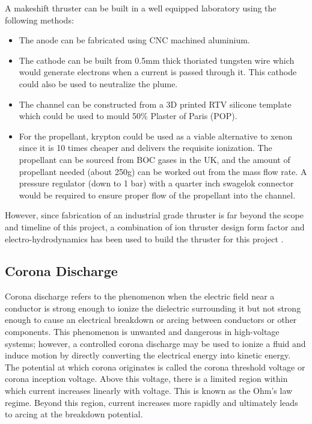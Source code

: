\documentclass[11pt]{article}
\begin{document}
A makeshift thruster can be built in a well equipped laboratory using the following methods:

\begin{itemize}
\item The anode can be fabricated using CNC machined aluminium.
\item The cathode can be built from 0.5mm thick thoriated tungsten wire which would generate electrons when a current is passed through it. This cathode could also be used to neutralize the plume.
\item The channel can be constructed from a 3D printed RTV silicone template which could be used to mould 50\% Plaster of Paris (POP).
\item For the propellant, krypton could be used as a viable alternative to xenon since it is 10 times cheaper and delivers the requisite ionization. The propellant can be sourced from BOC gases in the UK, and the amount of propellant needed (about 250g) can be worked out from the mass flow rate. A pressure regulator (down to 1 bar) with a quarter inch swagelok connector would be required to ensure proper flow of the propellant into the channel.
\end{itemize}


However, since fabrication of an industrial grade thruster is far beyond the scope and timeline of this project, a combination of ion thruster design form factor and electro-hydrodynamics has been used to build the thruster for this project \cite{prototype}.


\subsection{Corona Discharge}

Corona discharge refers to the phenomenon when the electric field near a conductor is strong enough to ionize the dielectric surrounding it but not strong enough to cause an electrical breakdown or arcing between conductors or other components. This phenomenon is unwanted and dangerous in high-voltage systems; however, a controlled corona discharge may be used to ionize a fluid and induce motion by directly converting the electrical energy into kinetic energy.\\

The potential at which corona originates is called the corona threshold voltage or corona inception voltage. Above this voltage, there is a limited region within which current increases linearly with voltage. This is known as the Ohm’s law regime. Beyond this region, current increases more rapidly and ultimately leads to arcing at the breakdown potential.\\
\end{document}
